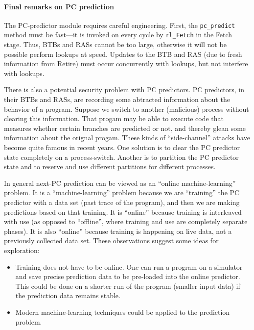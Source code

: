 
\paragraph{Final remarks on PC prediction}

The PC-predictor module requires careful engineering.  First, the
\verb|pc_predict| method must be fast---it is invoked on every cycle
by \verb|rl_Fetch| in the Fetch stage.  Thus, BTBs and RASs cannot be
too large, otherwise it will not be possible perform lookups at speed.
Updates to the BTB and RAS (due to fresh information from Retire) must
occur concurrently with lookups, but not interfere with lookups.

There is also a potential security problem with PC predictors.  PC
predictors, in their BTBs and RASs, are recording some abtracted
information about the behavior of a program.  Suppose we switch to
another (malicious) process without clearing this information. That
progam may be able to execute code that measures whether certain
branches are predicted or not, and thereby glean some information
about the orignal progam.  These kinds of ``side-channel'' attacks
have become quite famous in recent years.  One solution is to clear
the PC predictor state completely on a process-switch.  Another is to
partition the PC predictor state and to reserve and use different
partitions for different processes.

In general next-PC prediction can be viewed as an ``online
machine-learning'' problem.  It is a ``machine-learning'' problem
because we are ``training'' the PC predictor with a data set (past
trace of the program), and then we are making predictions based on
that training.  It is ``online'' because training is interleaved with
use (as opposed to ``offline'', where training and use are completely
separate phases).  It is also ``online'' because training is happening
on live data, not a previously collected data set.  These observations
suggest some ideas for exploration:

\begin{itemize}

 \item Training does not have to be online.  One can run a program on
       a simulator and save precise prediction data to be pre-loaded
       into the online predictor.  This could be done on a shorter run
       of the program (smaller input data) if the prediction data
       remains stable.

 \item Modern machine-learning techniques could be applied to the
       prediction problem.

\end{itemize}

